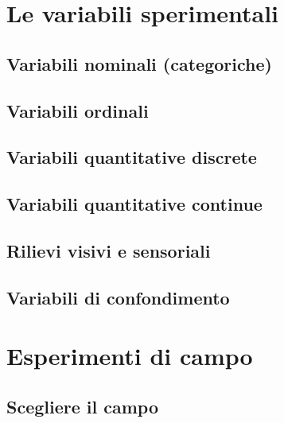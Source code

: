 \documentclass[a4paper,12pt,oneside]{book}
\begin{document}
\hypertarget{le-variabili-sperimentali}{%
\section{Le variabili sperimentali}\label{le-variabili-sperimentali}}

\hypertarget{variabili-nominali-categoriche}{%
\subsection{Variabili nominali (categoriche)}\label{variabili-nominali-categoriche}}

\hypertarget{variabili-ordinali}{%
\subsection{Variabili ordinali}\label{variabili-ordinali}}

\hypertarget{variabili-quantitative-discrete}{%
\subsection{Variabili quantitative discrete}\label{variabili-quantitative-discrete}}

\hypertarget{variabili-quantitative-continue}{%
\subsection{Variabili quantitative continue}\label{variabili-quantitative-continue}}

\hypertarget{rilievi-visivi-e-sensoriali}{%
\subsection{Rilievi visivi e sensoriali}\label{rilievi-visivi-e-sensoriali}}

\hypertarget{variabili-di-confondimento}{%
\subsection{Variabili di confondimento}\label{variabili-di-confondimento}}

\hypertarget{esperimenti-di-campo}{%
\section{Esperimenti di campo}\label{esperimenti-di-campo}}

\hypertarget{scegliere-il-campo}{%
\subsection{Scegliere il campo}\label{scegliere-il-campo}}
\end{document}

